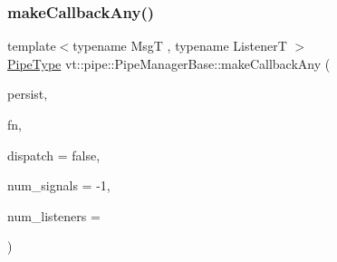 \mbox{\label{structvt_1_1pipe_1_1_pipe_manager_base_a465621a26a764f147228e8f814ac5d31}} 
\subsubsection{\texorpdfstring{make\+Callback\+Any()}{makeCallbackAny()}}
{\footnotesize\ttfamily template$<$typename MsgT , typename ListenerT $>$ \\
\hyperlink{namespacevt_ac9852acda74d1896f48f406cd72c7bd3}{Pipe\+Type} vt\+::pipe\+::\+Pipe\+Manager\+Base\+::make\+Callback\+Any (\begin{DoxyParamCaption}\item[{bool const \&}]{persist,  }\item[{ListenerT \&\&}]{fn,  }\item[{bool const \&}]{dispatch = {\ttfamily false},  }\item[{\hyperlink{namespacevt_ace18d74dd489d9ea506d38789fffce34}{Pipe\+Ref\+Type}}]{num\+\_\+signals = {\ttfamily -\/1},  }\item[{\hyperlink{namespacevt_ace18d74dd489d9ea506d38789fffce34}{Pipe\+Ref\+Type}}]{num\+\_\+listeners = {} }\end{DoxyParamCaption})\hspace{0.3cm}{\ttfamily [protected]}}

\mbox{\label{structvt_1_1pipe_1_1_pipe_manager_base_a57a1c95c5256aabd25c8a3e0bf58f5cc}} 

